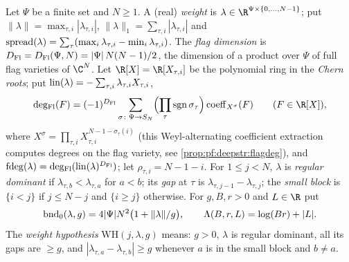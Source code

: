 \begin{definition}[Weights]\label{def:pf:deepstr:weights}
Let $\Psi$ be a finite set and $N\ge1$. A (real) \emph{weight} is $\lambda\in\R^{\Psi\times\{0,\dots,N-1\}}$; put
$\|\lambda\|=\max_{\tau,i}|\lambda_{\tau,i}|$, $\|\lambda\|_1=\sum_{\tau,i}|\lambda_{\tau,i}|$ and
$\operatorname{spread}(\lambda)=\sum_\tau(\max_i\lambda_{\tau,i}-\min_i\lambda_{\tau,i})$. The \emph{flag
dimension} is $D_{\mathrm{Fl}}=D_{\mathrm{Fl}}(\Psi,N)=|\Psi|\,N(N-1)/2$, the dimension of a product over $\Psi$ of
full flag varieties of $\C^N$. Let $\R[X]=\R[X_{\tau,i}]$ be the polynomial ring in the \emph{Chern roots};
put $\operatorname{lin}(\lambda)=-\sum_{\tau,i}\lambda_{\tau,i}X_{\tau,i}$,
\[
\deepstrdegFl(F)=(-1)^{\deepstrDim}\sum_{\sigma\colon\Psi\to S_N}\Bigl(\prod_\tau\operatorname{sgn}\sigma_\tau\Bigr)
\operatorname{coeff}_{X^{\sigma}}(F)\qquad(F\in\R[X]),
\]
where $X^\sigma=\prod_{\tau,i}X_{\tau,i}^{N-1-\sigma_\tau(i)}$ (this Weyl-alternating coefficient extraction computes
degrees on the flag variety, see \cref{prop:pf:deepstr:flagdeg}), and $\operatorname{fdeg}(\lambda)=\operatorname{deg_{Fl}}(\operatorname{lin}(\lambda)^{D_{\mathrm{Fl}}})$;
let $\rho_{\tau,i}=N-1-i$. For $1\le j<N$, $\lambda$ is \emph{regular dominant} if $\lambda_{\tau,b}<\lambda_{\tau,a}$
for $a<b$; its \emph{gap} at $\tau$ is $\lambda_{\tau,j-1}-\lambda_{\tau,j}$; the \emph{small block} is
$\{i<j\}$ if $j\le N-j$ and $\{i\ge j\}$ otherwise. For $g,B,r>0$ and $L\in\R$ put
\begin{equation}\label{eq:pf:deepstr:bnd}
\operatorname{bnd}_0(\lambda,g)=4|\Psi|N^2\bigl(1+\|\lambda\|/g\bigr),\qquad\Lambda(B,r,L)=\log(Br)+|L|.
\end{equation}
The \emph{weight hypothesis} $\mathrm{WH}(j,\lambda,g)$ means: $g>0$, $\lambda$ is regular dominant, all its
gaps are $\ge g$, and $|\lambda_{\tau,a}-\lambda_{\tau,b}|\ge g$ whenever $a$ is in the small block and $b\ne a$.
\end{definition}

